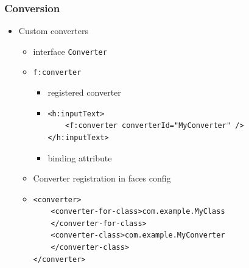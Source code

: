 \documentclass[10pt,xcolor=pdflatex]{beamer}
\begin{document}
\begin{frame}[fragile]\frametitle{Conversion}
	\begin{itemize}
		\item Custom converters
          \begin{itemize}
        	\item interface \texttt{Converter}
			\item \texttt{f:converter}
              \begin{itemize}
            	\item registered converter
                \item[]
                	\begin{verbatim}
<h:inputText>
    <f:converter converterId="MyConverter" />
</h:inputText>		\end{verbatim}
				\vspace{.05cm}
                \item binding attribute
              \end{itemize}
			\item Converter registration in faces config
            \vspace{.1cm}
            \item[]
            	\begin{verbatim}
<converter>
    <converter-for-class>com.example.MyClass
    </converter-for-class>
    <converter-class>com.example.MyConverter
    </converter-class>
</converter>            	
            	\end{verbatim}
          \end{itemize}
	\end{itemize}
\end{frame}
\end{document}
